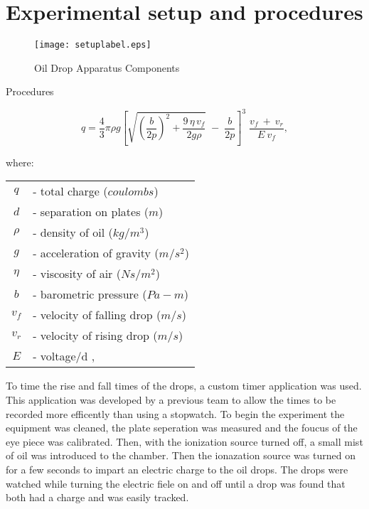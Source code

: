 \documentclass[twocolumn,secnumarabic,amssymb, nobibnotes, aps, pra]{revtex4}
\begin{document}
\section{Experimental setup and procedures}

\begin{figure} [h] 
\begin{center}
\texttt{[image: setuplabel.eps]} 
\end{center}
\caption{Oil Drop Apparatus Components}
\label{fig:label}
\end{figure}

Procedures

\begin{equation}
q= \frac{4}{3} \pi\rho g\left [ \sqrt{\left ( \frac{b}{2p} \right )^{2}+\frac{9\, \eta \, v_{f}}{2g\rho }} \; -\; \frac{b}{2p}\right ]^{3}\; \frac{v_{f}\: +\: v_{r}}{E\: v_{f}},
\end{equation}

where:

\begin{table} [htb]
\begin{tabular}{cl}
$q$ & - total charge ($coulombs$)\\
$d$ & - separation on plates ($m$)\\
$\rho$ & - density of oil ($kg/m^{3}$)\\
$g$ & - acceleration of gravity ($m/s^{2}$)\\
$\eta$ & - viscosity of air ($Ns/m^{2}$)\\
$b$ & - barometric pressure ($Pa-m$)\\
$v_{f}$ & - velocity of falling drop ($m/s$)\\
$v_{r}$ & - velocity of rising drop ($m/s$)\\
$E$ & - voltage/d ,\\
\end{tabular}
\end{table}


To time the rise and fall times of the drops, a custom timer application was used.  This application was developed by a previous team to allow the times to be recorded more efficently than using a stopwatch.  To begin the experiment the equipment was cleaned, the plate seperation was measured and the foucus of the eye piece was calibrated.  Then, with the ionization source turned off, a small mist of oil was introduced to the chamber.  Then the ionazation source was turned on for a few seconds to impart an electric charge to the oil drops.  The drops were watched while turning the electric fiele on and off until a drop was found that both had a charge and was easily tracked.  
\end{document}
